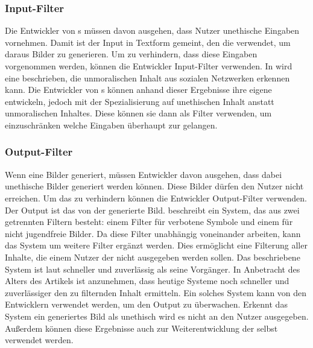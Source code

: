 \documentclass[12pt]{report}
\begin{document}
\subsubsection{Input-Filter}
Die Entwickler von s müssen davon ausgehen, dass Nutzer unethische Eingaben vornehmen. Damit ist der Input in Textform gemeint, den die  verwendet, um daraus Bilder zu generieren. Um zu verhindern, dass diese Eingaben vorgenommen werden, können die Entwickler Input-Filter verwenden. In \cite[Artificial Intelligence as a Service for Immoral ContentDetection and Eradication]{Shah} wird eine  beschrieben, die unmoralischen Inhalt aus sozialen Netzwerken erkennen kann. Die Entwickler von s können anhand dieser Ergebnisse ihre eigene  entwickeln, jedoch mit der Spezialisierung auf unethischen Inhalt anstatt unmoralischen Inhaltes. Diese  können sie dann als Filter verwenden, um einzuschränken welche Eingaben überhaupt zur  gelangen.

\subsubsection{Output-Filter}
Wenn eine  Bilder generiert, müssen Entwickler davon ausgehen, dass dabei unethische Bilder generiert werden können. Diese Bilder dürfen den Nutzer nicht erreichen. Um das zu verhindern können die Entwickler Output-Filter verwenden. Der Output ist das von der  generierte Bild. \cite{Zheng} beschreibt ein System, das aus zwei getrennten Filtern besteht: einem Filter für verbotene Symbole und einem für nicht jugendfreie Bilder. Da diese Filter unabhängig voneinander arbeiten, kann das System um weitere Filter ergänzt werden. Dies ermöglicht eine Filterung aller Inhalte, die einem Nutzer der  nicht ausgegeben werden sollen. Das beschriebene System ist laut \cite{Zheng} schneller und zuverlässig als seine Vorgänger. In Anbetracht des Alters des Artikels ist anzunehmen, dass heutige Systeme noch schneller und zuverlässiger den zu filternden Inhalt ermitteln. Ein solches System kann von den Entwicklern verwendet werden, um den Output zu überwachen. Erkennt das System ein generiertes Bild als unethisch wird es nicht an den Nutzer ausgegeben. Außerdem können diese Ergebnisse auch zur Weiterentwicklung der  selbst verwendet werden.
\end{document}
